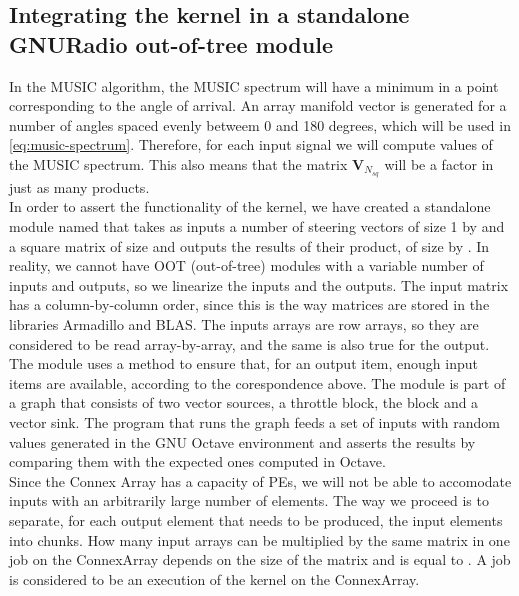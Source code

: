 \subsection{Integrating the kernel in a standalone GNURadio out-of-tree module}

In the MUSIC algorithm, the MUSIC spectrum will have a minimum in a point
corresponding to the angle of arrival. An array manifold vector is generated for
a number of  angles spaced evenly betweem 0 and 180
degrees, which will be used in \eqref{eq:music-spectrum}. Therefore, for each
input signal we will compute  values of the MUSIC
spectrum. This also means that the matrix $\bm{V}_{N_{sq}}$ will be a factor
in just as many products. \\

In order to assert the functionality of the kernel, we have created a standalone
module named  that takes as inputs a number of
 steering vectors of size 1 by  and a square
matrix of size  and outputs the results of their product, of
size  by . In reality, we cannot have OOT
(out-of-tree) modules with a variable number of inputs and outputs, so we
linearize the inputs and the outputs.  The input matrix has a column-by-column order,
since this is the way matrices are stored in the libraries Armadillo \cite{cite:armadillo}
and BLAS\cite{cite:blas}. The inputs arrays are row arrays, so they
are considered to be read array-by-array, and the same is also true for the
output. \\

The module uses a  method to ensure that, for an output item,
enough input items are available, according to the corespondence above. The
module is part of a graph that consists of two vector sources, a throttle block,
the  block and a vector sink. The program that runs the graph
feeds a set of inputs with random values generated in the GNU Octave
\cite{cite:octave} environment and asserts the results by comparing them with the
expected ones computed in Octave. \\

Since the Connex Array has a capacity of  PEs,
we will not be able to accomodate inputs with an arbitrarily large number of
elements. The way we proceed is to separate, for each output element that needs
to be produced, the input elements into chunks. How many input arrays can be
multiplied by the same matrix in one job on the ConnexArray depends on the size
of the matrix  and is equal to . A job is considered to be an execution of the kernel on the
ConnexArray. \\

